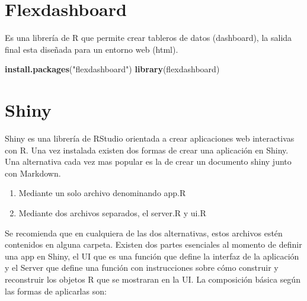 \documentclass[
]{book}
\newenvironment{Shaded}{\begin{snugshade}}{\end{snugshade}}
\newcommand{\CommentTok}[1]{\textcolor[rgb]{0.56,0.35,0.01}{\textit{#1}}}
\newcommand{\ControlFlowTok}[1]{\textcolor[rgb]{0.13,0.29,0.53}{\textbf{#1}}}
\newcommand{\DataTypeTok}[1]{\textcolor[rgb]{0.13,0.29,0.53}{#1}}
\newcommand{\DecValTok}[1]{\textcolor[rgb]{0.00,0.00,0.81}{#1}}
\newcommand{\KeywordTok}[1]{\textcolor[rgb]{0.13,0.29,0.53}{\textbf{#1}}}
\newcommand{\NormalTok}[1]{#1}
\newcommand{\OperatorTok}[1]{\textcolor[rgb]{0.81,0.36,0.00}{\textbf{#1}}}
\newcommand{\StringTok}[1]{\textcolor[rgb]{0.31,0.60,0.02}{#1}}
\providecommand{\tightlist}{%
  \setlength{\itemsep}{0pt}\setlength{\parskip}{0pt}}
\begin{document}
\hypertarget{flexdashboard}{%
\section{Flexdashboard}\label{flexdashboard}}

Es una librería de R que permite crear tableros de datos (dashboard), la salida final esta diseñada para un entorno web (html).

\begin{Shaded}
\begin{Highlighting}[]
\KeywordTok{install.packages}\NormalTok{(}\StringTok{"flexdashboard"}\NormalTok{)}
\KeywordTok{library}\NormalTok{(flexdashboard)}
\end{Highlighting}
\end{Shaded}

\hypertarget{shiny}{%
\section{Shiny}\label{shiny}}

Shiny es una librería de RStudio orientada a crear aplicaciones web interactivas con R. Una vez instalada existen dos formas de crear una aplicación en Shiny.
Una alternativa cada vez mas popular es la de crear un documento shiny junto con Markdown.

\begin{enumerate}
\def\labelenumi{\arabic{enumi}.}
\tightlist
\item
  Mediante un solo archivo denominando app.R
\item
  Mediante dos archivos separados, el server.R y ui.R
\end{enumerate}

Se recomienda que en cualquiera de las dos alternativas, estos archivos estén contenidos en alguna carpeta. Existen dos partes esenciales al momento de definir una app en Shiny, el UI que es una función que define la interfaz de la aplicación y el Server que define una función con instrucciones sobre cómo construir y reconstruir los objetos R que se mostraran en la UI. La composición básica según las formas de aplicarlas son:

\begin{Shaded}
\end{Shaded}
\end{document}
